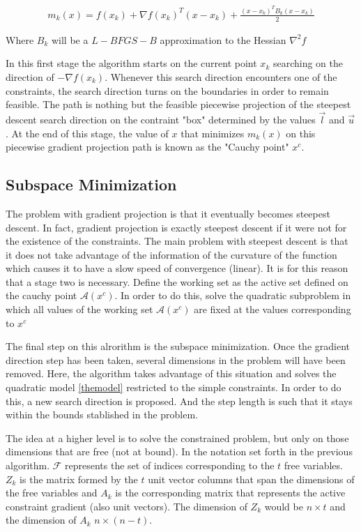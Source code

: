 \begin{equation} \label{themodel}
  \begin{aligned}
    m_k(x) = f(x_k) + \nabla f(x_k)^T ( x - x_k) + \frac{(x - x_k)^T B_k (x - x_k) }{2}
  \end{aligned}
\end{equation}

Where $B_k$ will be a $L-BFGS-B$ approximation to the Hessian $\nabla^2 f$

In this first stage the algorithm starts on the current point $x_k$ searching on the direction of $-\nabla f(x_k)$. Whenever this search direction encounters one of the constraints, the search direction turns on the boundaries in order to remain feasible. The path is nothing but the feasible piecewise projection of the steepest descent search direction on the contraint "box" determined by the values $\overrightarrow{l}$ and $\overrightarrow{u}$. At the end of this stage, the value of $x$ that minimizes $m_k(x)$ on this piecewise gradient projection path is known as the "Cauchy point" $x^c$.

\subsection{Subspace Minimization}

The problem with gradient projection is that it eventually becomes steepest descent. In fact, gradient projection is exactly steepest descent if it were not for the existence of the constraints. The main problem with steepest descent is that it does not take advantage of the information of the curvature of the function which causes it to have a slow speed of convergence (linear). It is for this reason that a stage two is necessary. Define the working set as the active set defined on the cauchy point $\mathcal{A}(x^c)$. In order to do this, solve the quadratic subproblem in which all values of the working set $\mathcal{A}(x^c)$ are fixed at the values corresponding to $x^c$


The final step on this alrorithm is the subspace minimization. Once the gradient direction step has been taken, several dimensions in the problem will have been removed. Here, the algorithm takes advantage of this situation and solves the quadratic model \ref{themodel} restricted to the simple constraints. In order to do this, a new search direction is proposed. And the step length is such that it stays within the bounds stablished in the problem.

The idea at a higher level is to solve the constrained problem, but only on those dimensions that are free (not at bound). In the notation set forth in the previous algorithm. $\mathcal{F}$ represents the set of indices corresponding to the $t$ free variables. $Z_k$ is the matrix formed by the $t$ unit vector columns that span the dimensions of the free variables and $A_k$ is the corresponding matrix that represents the active constraint gradient (also unit vectors). The dimension of $Z_k$ would be $n \times t$ and the dimension of $A_k$ $n \times (n - t)$.

